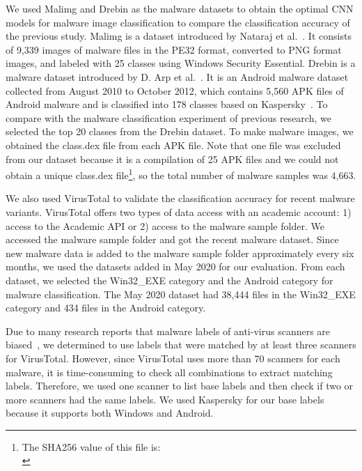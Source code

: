 \documentclass[conference]{IEEEtran}
\begin{document}
We used Malimg and Drebin as the malware datasets to obtain the optimal CNN models for malware image classification to compare the classification accuracy of the previous study.
Malimg is a dataset introduced by Nataraj et al.~\cite{10.1145/2016904.2016908}.
It consists of 9,339 images of malware files in the PE32 format, converted to PNG format images, and labeled with 25 classes using Windows Security Essential.
Drebin is a malware dataset introduced by D. Arp et al.~\cite{arp2014drebin}.
It is an Android malware dataset collected from August 2010 to October 2012, which contains 5,560 APK files of Android malware and is classified into 178 classes based on Kaspersky~\cite{kaspersky-soft}.
To compare with the malware classification experiment of previous research, we selected the top 20 classes from the Drebin dataset.
To make malware images, we obtained the class.dex file from each APK file.
Note that one file was excluded from our dataset because it is a compilation of 25 APK files and we could not obtain a unique class.dex file\footnote{The SHA256 value of this file is:\\
}, so the total number of malware samples was 4,663.

We also used VirusTotal to validate the classification accuracy for recent malware variants.
VirusTotal offers two types of data access with an academic account: 1) access to the Academic API or 2) access to the malware sample folder.
We accessed the malware sample folder and got the recent malware dataset.
Since new malware data is added to the malware sample folder approximately every six months, we used the datasets added in May 2020 for our evaluation.
From each dataset, we selected the Win32\_EXE category and the Android category for malware classification.
The May 2020 dataset had 38,444 files in the Win32\_EXE category and 434 files in the Android category.

Due to many research reports that malware labels of anti-virus scanners are biased~\cite{10.1145/3463274.3463336,10.1145/3427228.3427261,10.1145/3422337.3447849,8937650,10.1145/3474369.3486873}, we determined to use labels that were matched by at least three scanners for VirusTotal.
However, since VirusTotal uses more than 70 scanners for each malware, it is time-consuming to check all combinations to extract matching labels.
Therefore, we used one scanner to list base labels and then check if two or more scanners had the same labels.
We used Kaspersky for our base labels because it supports both Windows and Android.
\end{document}
